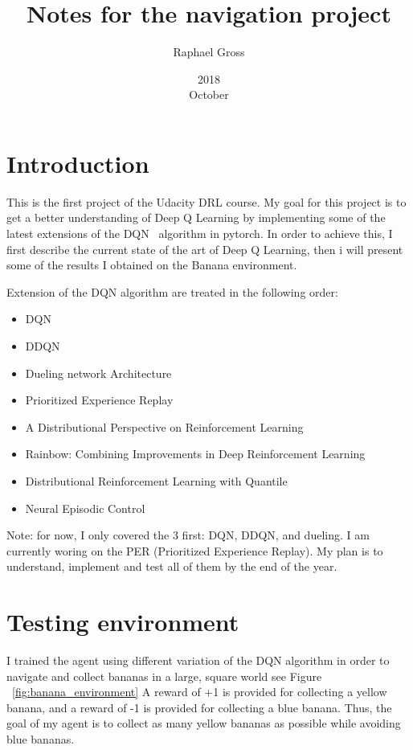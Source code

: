 \documentclass[12pt]{article}
\begin{document}
\title{Notes for the navigation project}
\date{2018\\ October}
\author{Raphael Gross}
\maketitle




\section{Introduction}
This is the first project of the Udacity DRL course. My goal for this project is to get a better understanding of Deep Q Learning by implementing some of the latest extensions of the DQN~\cite{mnih2015humanlevel} algorithm in pytorch. In order to achieve this, I first describe the current state of the art of Deep Q Learning, then i will present some of the results I obtained on the Banana environment.

Extension of the DQN  algorithm are treated in the following order:

\begin{itemize}
\item DQN~\cite{mnih2015humanlevel}
\item DDQN~\cite{Hasselt2016}
\item Dueling network Architecture~\cite{BellemareDM17}
\item Prioritized Experience Replay
\item A Distributional Perspective on Reinforcement Learning
\item Rainbow: Combining Improvements in Deep Reinforcement Learning 
\item Distributional Reinforcement Learning with Quantile 
\item Neural Episodic Control
\end{itemize}


Note: for now, I only covered the 3 first: DQN, DDQN, and dueling. I am currently woring on the PER (Prioritized Experience Replay). My plan is to understand, implement and test all of them by the end of the year.

\section{Testing environment}
I trained the agent using different variation of the DQN algorithm in order to navigate and collect bananas in a large, square world see Figure ~\ref{fig:banana_environment}
A reward of +1 is provided for collecting a yellow banana, and a reward of -1 is provided for collecting a blue banana. Thus, the goal of my agent is to collect as many yellow bananas as possible while avoiding blue bananas.
\end{document}
